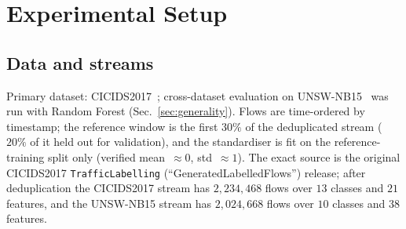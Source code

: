 \documentclass[conference]{IEEEtran}
\begin{document}
\section{Experimental Setup}
\label{sec:setup}
\subsection{Data and streams}
Primary dataset: CICIDS2017~\cite{sharafaldin2018cicids}; cross-dataset evaluation on UNSW-NB15~\cite{moustafa2015unsw} was run with Random Forest (Sec.~\ref{sec:generality}). Flows are time-ordered by timestamp; the reference window is the first $30\%$ of the deduplicated stream ($20\%$ of it held out for validation), and the standardiser is fit on the reference-training split only (verified mean~$\approx0$, std~$\approx1$). The exact source is the original CICIDS2017 \texttt{TrafficLabelling} (``GeneratedLabelledFlows'') release; after deduplication the CICIDS2017 stream has $2{,}234{,}468$ flows over $13$ classes and $21$ features, and the UNSW-NB15 stream has $2{,}024{,}668$ flows over $10$ classes and $38$ features.
\end{document}
